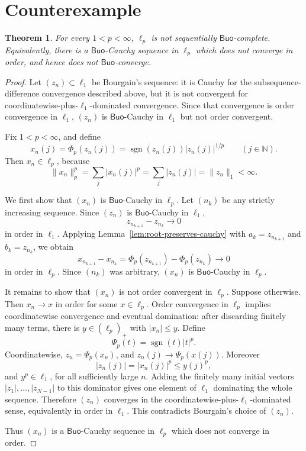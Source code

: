 \documentclass[11pt]{article}
\newtheorem{theorem}{Theorem}
\newcommand{\Buo}{\mathsf{Buo}}
\newcommand{\sgn}{\operatorname{sgn}}
\begin{document}
\section*{Counterexample}

\begin{theorem}
For every \(1<p<\infty\), \(\ell_p\) is not sequentially
\(\Buo\)-complete.  Equivalently, there is a \(\Buo\)-Cauchy sequence in
\(\ell_p\) which does not converge in order, and hence does not
\(\Buo\)-converge.
\end{theorem}

\begin{proof}
Let \((z_n)\subset\ell_1\) be Bourgain's sequence: it is Cauchy for the
subsequence-difference convergence described above, but it is not convergent
for coordinatewise-plus-\(\ell_1\)-dominated convergence.  Since that
convergence is order convergence in \(\ell_1\), \((z_n)\) is \(\Buo\)-Cauchy
in \(\ell_1\) but not order convergent.

Fix \(1<p<\infty\), and define
\[
        x_n(j)=\Phi_p(z_n(j))
        =\sgn(z_n(j))|z_n(j)|^{1/p}\qquad(j\in\mathbb N).
\]
Then \(x_n\in\ell_p\), because
\[
        \|x_n\|_p^p=\sum_j |x_n(j)|^p
        =\sum_j |z_n(j)|=\|z_n\|_1<\infty.
\]

We first show that \((x_n)\) is \(\Buo\)-Cauchy in \(\ell_p\).  Let
\((n_k)\) be any strictly increasing sequence.  Since \((z_n)\) is
\(\Buo\)-Cauchy in \(\ell_1\),
\[
        z_{n_{k+1}}-z_{n_k}\to0
\]
in order in \(\ell_1\).  Applying Lemma~\ref{lem:root-preserves-cauchy} with
\(a_k=z_{n_{k+1}}\) and \(b_k=z_{n_k}\), we obtain
\[
        x_{n_{k+1}}-x_{n_k}
        =\Phi_p(z_{n_{k+1}})-\Phi_p(z_{n_k})\to0
\]
in order in \(\ell_p\).  Since \((n_k)\) was arbitrary, \((x_n)\) is
\(\Buo\)-Cauchy in \(\ell_p\).

It remains to show that \((x_n)\) is not order convergent in \(\ell_p\).
Suppose otherwise.  Then \(x_n\to x\) in order for some \(x\in\ell_p\).
Order convergence in \(\ell_p\) implies coordinatewise convergence and
eventual domination: after discarding finitely many terms, there is
\(y\in(\ell_p)_+\) with \(|x_n|\le y\).  Define
\[
        \Psi_p(t)=\sgn(t)|t|^p.
\]
Coordinatewise, \(z_n=\Psi_p(x_n)\), and \(z_n(j)\to\Psi_p(x(j))\).  Moreover
\[
        |z_n(j)|=|x_n(j)|^p\le y(j)^p,
\]
and \(y^p\in\ell_1\), for all sufficiently large \(n\).  Adding the finitely
many initial vectors \(|z_1|,\ldots,|z_{N-1}|\) to this dominator gives one
element of \(\ell_1\) dominating the whole sequence.  Therefore \((z_n)\)
converges in the coordinatewise-plus-\(\ell_1\)-dominated sense, equivalently
in order in \(\ell_1\).  This contradicts Bourgain's choice of \((z_n)\).

Thus \((x_n)\) is a \(\Buo\)-Cauchy sequence in \(\ell_p\) which does not
converge in order.
\end{proof}
\end{document}

